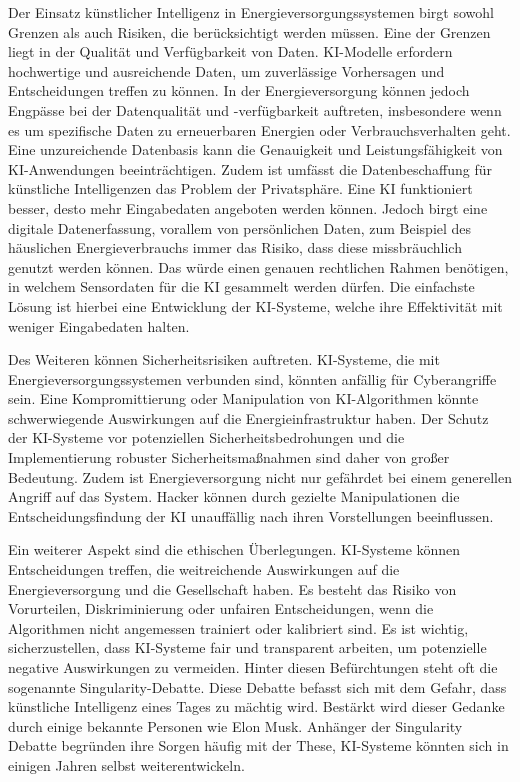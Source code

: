 Der Einsatz künstlicher Intelligenz in Energieversorgungssystemen birgt
sowohl Grenzen als auch Risiken, die berücksichtigt werden müssen. Eine der
Grenzen liegt in der Qualität und Verfügbarkeit von Daten. KI-Modelle erfordern
hochwertige und ausreichende Daten, um zuverlässige Vorhersagen und
Entscheidungen treffen zu können. In der Energieversorgung können jedoch
Engpässe bei der Datenqualität und -verfügbarkeit auftreten, insbesondere wenn
es um spezifische Daten zu erneuerbaren Energien oder Verbrauchsverhalten geht.
Eine unzureichende Datenbasis kann die Genauigkeit und Leistungsfähigkeit von
KI-Anwendungen beeinträchtigen. Zudem ist umfässt die Datenbeschaffung für
künstliche Intelligenzen das Problem der Privatsphäre. Eine KI funktioniert
besser, desto mehr Eingabedaten angeboten werden können. Jedoch birgt eine
digitale Datenerfassung, vorallem von persönlichen Daten, zum Beispiel des
häuslichen Energieverbrauchs immer das Risiko, dass diese missbräuchlich
genutzt werden können. Das würde einen genauen rechtlichen Rahmen benötigen, in
welchem Sensordaten für die KI gesammelt werden dürfen. Die einfachste Lösung
ist hierbei eine Entwicklung der KI-Systeme, welche ihre Effektivität mit
weniger Eingabedaten halten.\cite{dreyer2019kunstliche}

Des Weiteren können Sicherheitsrisiken auftreten. KI-Systeme, die mit
Energieversorgungssystemen verbunden sind, könnten anfällig für Cyberangriffe
sein. Eine Kompromittierung oder Manipulation von KI-Algorithmen könnte
schwerwiegende Auswirkungen auf die Energieinfrastruktur haben. Der Schutz der
KI-Systeme vor potenziellen Sicherheitsbedrohungen und die Implementierung
robuster Sicherheitsmaßnahmen sind daher von großer Bedeutung. Zudem ist
Energieversorgung nicht nur gefährdet bei einem generellen Angriff auf das
System. Hacker können durch gezielte Manipulationen die Entscheidungsfindung
der KI unauffällig nach ihren Vorstellungen beeinflussen.
\cite{dreyer2019kunstliche}

Ein weiterer Aspekt sind die ethischen Überlegungen. KI-Systeme können
Entscheidungen treffen, die weitreichende Auswirkungen auf die
Energieversorgung und die Gesellschaft haben. Es besteht das Risiko von
Vorurteilen, Diskriminierung oder unfairen Entscheidungen, wenn die Algorithmen
nicht angemessen trainiert oder kalibriert sind. Es ist wichtig,
sicherzustellen, dass KI-Systeme fair und transparent arbeiten, um potenzielle
negative Auswirkungen zu vermeiden. Hinter diesen Befürchtungen steht oft die
sogenannte Singularity-Debatte. Diese Debatte befasst sich mit dem Gefahr, dass
künstliche Intelligenz eines Tages zu mächtig wird. Bestärkt wird dieser
Gedanke durch einige bekannte Personen wie Elon Musk. Anhänger der Singularity
Debatte begründen ihre Sorgen häufig mit der These, KI-Systeme könnten sich in
einigen Jahren selbst weiterentwickeln.\cite{buxmann2021ethische}

